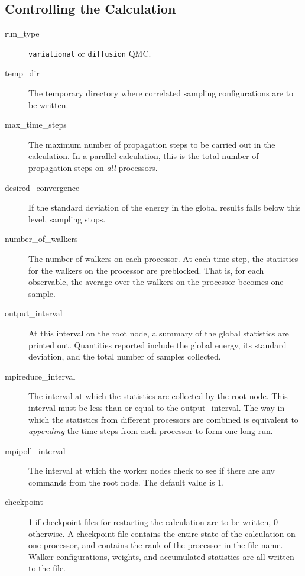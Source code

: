 \documentclass[11pt]{article}
\begin{document}
\subsection{Controlling the Calculation}

\begin{description}

\item [run\_type] \verb-variational- or \verb-diffusion- QMC.

\item [temp\_dir] The temporary directory where correlated
  sampling configurations are to be written.

\item [max\_time\_steps] The maximum number of propagation steps to be
  carried out in the calculation.  In a parallel calculation, this is
  the total number of propagation steps on \emph{all} processors. 

\item [desired\_convergence] If the standard deviation of the energy in
  the global results falls below this level, sampling stops.  

\item [number\_of\_walkers] The number of walkers on each processor.  At
  each time step, the statistics for the walkers on the processor are
  preblocked.  That is, for each observable, the average over the
  walkers on the processor becomes one sample.   

\item [output\_interval] At this interval on the root node, a summary of
  the global statistics are printed out.  Quantities reported include
  the global energy, its standard deviation, and the total number of
  samples collected. 

\item [mpireduce\_interval] The interval at which the statistics are
  collected by the root node.  This interval must be less than or
  equal to the output\_interval.  The way in which the statistics from
  different processors are combined is equivalent to \emph{appending}
  the time steps from each processor to form one long run.     

\item [mpipoll\_interval] The interval at which the worker nodes
  check to see if there are any commands from the root node.  The
  default value is 1.

\item [checkpoint] 1 if checkpoint files for restarting the calculation
  are to be written, 0 otherwise.  A checkpoint file contains the
  entire state of the calculation on one processor, and contains the
  rank of the processor in the file name.  Walker configurations,
  weights, and accumulated statistics are all written to the file.  


\end{description}
\end{document}
